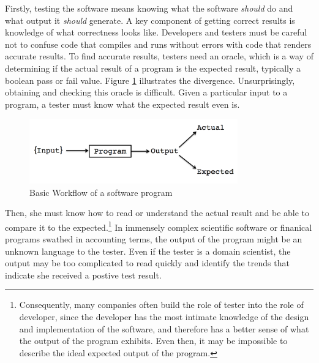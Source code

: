 Firstly, testing the software means knowing what the software \textit{should} do and what output it \textit{should} generate. A key component of getting correct results is knowledge of what correctness looks like. Developers and testers must be careful not to confuse code that compiles and runs without errors with code that renders accurate results. To find accurate results, testers need an oracle, which is a way of determining if the actual result of a program is the expected result, typically a boolean pass or fail value. Figure \ref{fig:workflow} illustrates the divergence. Unsurprisingly, obtaining and checking this oracle is difficult. Given a particular input to a program, a tester must know what the expected result even is. 
\begin{figure}
\centering
\includegraphics[width=90mm,scale=0.5]{diagram.png}
\caption{Basic Workflow of a software program}
\label{fig:workflow}
\end{figure}
Then, she must know how to read or understand the actual result and be able to compare it to the expected.\footnote{Consequently, many companies often build the role of tester into the role of developer, since the developer has the most intimate knowledge of the design and implementation of the software, and therefore has a better sense of what the output of the program exhibits. Even then, it may be impossible to describe the ideal expected output of the program.} In immensely complex scientific software or finanical programs swathed in accounting terms, the output of the program might be an unknown language to the tester. Even if the tester is a domain scientist, the output may be too complicated to read quickly and identify the trends that indicate she received a postive test result.

